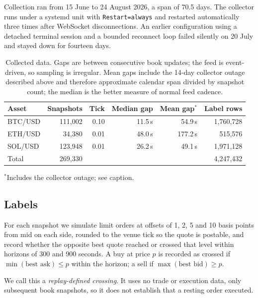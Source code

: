 \documentclass[11pt]{article}
\begin{document}
Collection ran from 15 June to 24 August 2026, a span of 70.5 days. The
collector runs under a systemd unit with \texttt{Restart=always} and restarted
automatically three times after WebSocket disconnections. An earlier
configuration using a detached terminal session and a bounded reconnect loop
failed silently on 20 July and stayed down for fourteen days.

\begin{table}[ht]
\centering
\caption{Collected data. Gaps are between consecutive book updates; the feed
is event-driven, so sampling is irregular. Mean gaps include the 14-day
collector outage described above and therefore approximate calendar span
divided by snapshot count; the median is the better measure of normal feed
cadence.}
\label{tab:data}
\begin{tabular}{lrrrrr}
\toprule
Asset & Snapshots & Tick & Median gap & Mean gap$^{*}$ & Label rows \\
\midrule
BTC/USD & 111{,}002 & 0.10 & 11.5\,s & 54.9\,s & 1{,}760{,}728 \\
ETH/USD &  34{,}380 & 0.01 & 48.0\,s & 177.2\,s &  515{,}576 \\
SOL/USD & 123{,}948 & 0.01 & 26.2\,s & 49.1\,s & 1{,}971{,}128 \\
\midrule
Total   & 269{,}330 &      &         &         & 4{,}247{,}432 \\
\bottomrule
\end{tabular}

\vspace{0.4em}
{\footnotesize $^{*}$Includes the collector outage; see caption.}
\end{table}

\subsection{Labels}
\label{sec:labels}

For each snapshot we simulate limit orders at offsets of 1, 2, 5 and 10 basis
points from mid on each side, rounded to the venue tick so the quote is
postable, and record whether the opposite best quote reached or crossed that
level within horizons of 300 and 900 seconds. A buy at price $p$ is recorded as
crossed if $\min(\text{best ask}) \leq p$ within the horizon; a sell if
$\max(\text{best bid}) \geq p$.

We call this a \emph{replay-defined crossing}. It uses no trade or execution
data, only subsequent book snapshots, so it does not establish that a resting
order executed.
\end{document}
